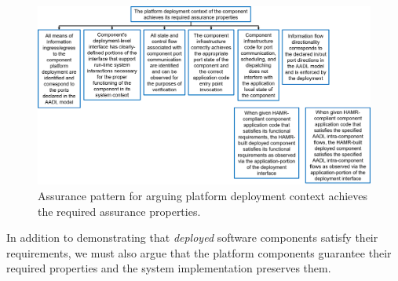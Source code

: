 \begin{figure}[h] 
	\centering 
	\includegraphics[width=\textwidth]{figs/platform-deployment-context-achieves-assurance-properties.png}
	\caption{Assurance pattern for arguing platform deployment context achieves the required assurance properties.}
	\label{fig:platform-deployment-context-achieves-assurance-properties} 
\end{figure}


In addition to demonstrating that \textit{deployed} software components satisfy their requirements, we must also argue that the platform components guarantee their required properties and the system implementation preserves them.

